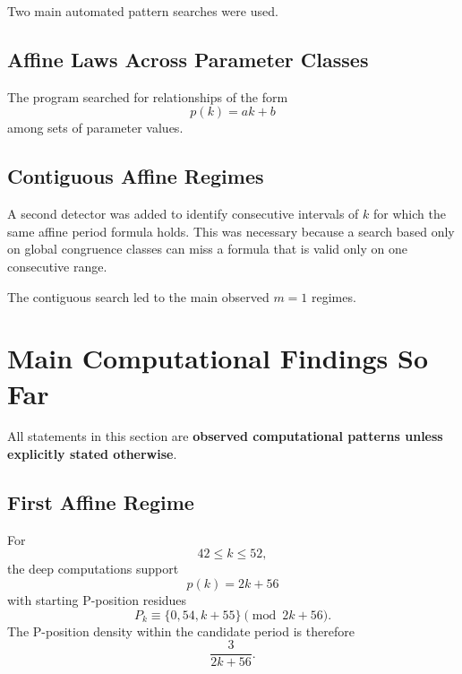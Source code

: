 \documentclass[11pt]{article}
\begin{document}
Two main automated pattern searches were used.

\subsection{Affine Laws Across Parameter Classes}
The program searched for relationships of the form
\begin{equation}
    p(k)=ak+b
\end{equation}
among sets of parameter values.

\subsection{Contiguous Affine Regimes}
A second detector was added to identify consecutive intervals of $k$ for which the same affine period formula holds. This was necessary because a search based only on global congruence classes can miss a formula that is valid only on one consecutive range.

The contiguous search led to the main observed $m=1$ regimes.

\section{Main Computational Findings So Far}

All statements in this section are \textbf{observed computational patterns unless explicitly stated otherwise}.

\subsection{First Affine Regime}
For
\begin{equation}
    42\le k\le52,
\end{equation}
the deep computations support
\begin{equation}
\boxed{p(k)=2k+56}
\end{equation}
with starting P-position residues
\begin{equation}
\boxed{
    P_k\equiv\{0,54,k+55\}\pmod{2k+56}.
}
\end{equation}
The P-position density within the candidate period is therefore
\begin{equation}
    \frac{3}{2k+56}.
\end{equation}
\end{document}
